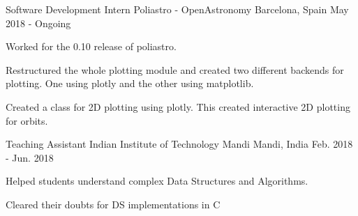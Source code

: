 


\begin{cventries}


\cventry
{Software Development Intern} %
{Poliastro - OpenAstronomy} %
{Barcelona, Spain} %
{May 2018 - Ongoing} %
{ %
\begin{cvitems}
\item {Worked for the 0.10 release of poliastro.}
\item {Restructured the whole plotting module and created two different backends for plotting. One using plotly and the other using matplotlib.}
\item {Created a class for 2D plotting using plotly. This created interactive 2D plotting for orbits.}
\end{cvitems}
}


\cventry
{Teaching Assistant} %
{Indian Institute of Technology Mandi} %
{Mandi, India} %
{Feb. 2018 - Jun. 2018} %
{ %
\begin{cvitems}
\item {Helped students understand complex Data Structures and Algorithms.}
\item {Cleared their doubts for DS implementations in C}
\end{cvitems}
}



\end{cventries}
